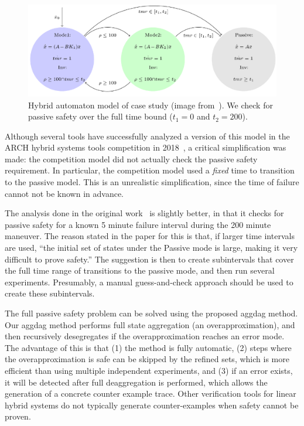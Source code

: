 \begin{figure}[t]
\centerline{\includegraphics[width=0.9\columnwidth]{images/ha.png}}
\caption{Hybrid automaton model of case study (image from~\cite{chan2017verifying}). We check for passive safety over the full time bound ($t_1=0$ and $t_2=200$).}
\label{fig:ha}
\end{figure}

Although several tools have successfully analyzed a version of this model in the ARCH hybrid systems tools competition in 2018~\cite{archcomp18linear}, a critical simplification was made: the competition model did not actually check the passive safety requirement. In particular, the competition model used a \emph{fixed} time to transition to the passive model. This is an unrealistic simplification, since the time of failure cannot not be known in advance. 

The analysis done in the original work~\cite{chan2017verifying} is slightly better, in that it checks for passive safety for a known 5 minute failure interval during the 200 minute maneuver. The reason stated in the paper for this is that, if larger time intervals are used,
``the initial set of states under the Passive mode is large, making it very difficult to prove safety.'' The suggestion is then to create subintervals that cover the full time range of transitions to the passive mode, and then run several experiments. Presumably, a manual guess-and-check approach should be used to create these subintervals.

The full passive safety problem can be solved using the proposed aggdag method. Our aggdag method performs full state aggregation (an overapproximation), and then recursively desegregates if the overapproximation reaches an error mode. The advantage of this is that (1) the method is fully automatic, (2) steps where the overapproximation is safe can be skipped by the refined sets, which is more efficient than using multiple independent experiments, and (3) if an error exists, it will be detected after full deaggregation is performed, which allows the generation of a concrete counter example trace. Other verification tools for linear hybrid systems do not typically generate counter-examples when safety cannot be proven.


